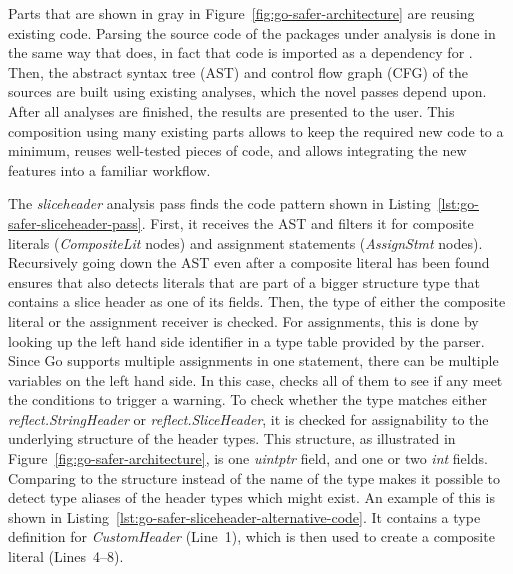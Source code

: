 

Parts that are shown in gray in Figure~\ref{fig:go-safer-architecture} are reusing existing code.
Parsing the source code of the packages under analysis is done in the same way that \toolVet{} does, in fact that code
is imported as a dependency for \toolSafer{}.
Then, the abstract syntax tree (\acrshort{AST}) and control flow graph (\acrshort{CFG}) of the sources are built using
existing analyses, which the novel \toolSafer{} passes depend upon.
After all analyses are finished, the results are presented to the user.
This composition using many existing parts allows to keep the required new code to a minimum, reuses well-tested pieces
of code, and allows integrating the new \toolSafer{} features into a familiar workflow.

The \textit{sliceheader} analysis pass finds the code pattern shown in Listing~\ref{lst:go-safer-sliceheader-pass}.
First, it receives the \acrshort{AST} and filters it for composite literals (\textit{CompositeLit} nodes) and
assignment statements (\textit{AssignStmt} nodes).
Recursively going down the \acrshort{AST} even after a composite literal has been found ensures that \toolSafer{} also
detects literals that are part of a bigger structure type that contains a slice header as one of its fields.
Then, the type of either the composite literal or the assignment receiver is checked.
For assignments, this is done by looking up the left hand side identifier in a type table provided by the parser.
Since Go supports multiple assignments in one statement, there can be multiple variables on the left hand side.
In this case, \toolSafer{} checks all of them to see if any meet the conditions to trigger a warning.
To check whether the type matches either \textit{reflect.StringHeader} or \textit{reflect.SliceHeader}, it is checked
for assignability to the underlying structure of the header types.
This structure, as illustrated in Figure~\ref{fig:go-safer-architecture}, is one \textit{uintptr} field, and one or two
\textit{int} fields.
Comparing to the structure instead of the name of the type makes it possible to detect type aliases of the header types
which might exist.
An example of this is shown in Listing~\ref{lst:go-safer-sliceheader-alternative-code}.
It contains a type definition for \textit{CustomHeader} (Line~1), which is then used to create a composite literal
(Lines~4--8).



